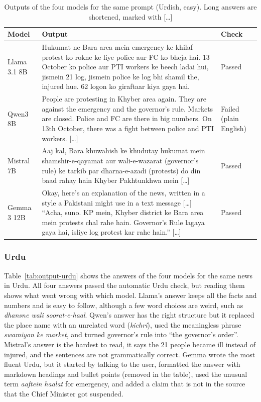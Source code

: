 \documentclass{FastFyp}
\begin{document}
\begin{table}[H]
\centering
\caption{Outputs of the four models for the same prompt (Urdish, easy). Long answers are shortened, marked with [\dots]}
\label{tab:output-urdish}
\small
\begin{tabular}{|p{}|p{}|p{}|}
\hline
\textbf{Model} & \textbf{Output} & \textbf{Check} \\ \hline
Llama 3.1 8B & Hukumat ne Bara area mein emergency ke khilaf protest ko rokne ke liye police aur FC ko bheja hai. 13 October ko police aur PTI workers ke beech ladai hui, jismein 21 log, jismein police ke log bhi shamil the, injured hue. 62 logon ko giraftaar kiya gaya hai. & Passed \\ \hline
Qwen3 8B & People are protesting in Khyber area again. They are against the emergency and the governor's rule. Markets are closed. Police and FC are there in big numbers. On 13th October, there was a fight between police and PTI workers. [\dots] & Failed (plain English) \\ \hline
Mistral 7B & Aaj kal, Bara khuwahish ke khudutay hukumat mein shamshir-e-qayamat aur wali-e-wazarat (governor's rule) ke tarkib par dharna-e-azadi (protests) do din baad rahay hain Khyber Pakhtunkhwa mein [\dots] & Passed \\ \hline
Gemma 3 12B & Okay, here's an explanation of the news, written in a style a Pakistani might use in a text message [\dots] ``Acha, suno. KP mein, Khyber district ke Bara area mein protests chal rahe hain. Governor's Rule lagaya gaya hai, isliye log protest kar rahe hain.'' [\dots] & Passed \\ \hline
\end{tabular}
\end{table}


\subsubsection{Urdu}
Table~\ref{tab:output-urdu} shows the answers of the four models for the same news in Urdu. All four answers passed the automatic Urdu check, but reading them shows what went wrong with which model. Llama's answer keeps all the facts and numbers and is easy to follow, although a few word choices are weird, such as \textit{dhansne wali soorat-e-haal}. Qwen's answer has the right structure but it replaced the place name with an unrelated word (\textit{kichri}), used the meaningless phrase \textit{swamiyon ke market}, and turned governor's rule into ``the governor's order''. Mistral's answer is the hardest to read, it says the 21 people became ill instead of injured, and the sentences are not grammatically correct. Gemma wrote the most fluent Urdu, but it started by talking to the user, formatted the answer with markdown headings and bullet points (removed in the table), used the unusual term \textit{aaftein haalat} for emergency, and added a claim that is not in the source that the Chief Minister got suspended.
\end{document}
